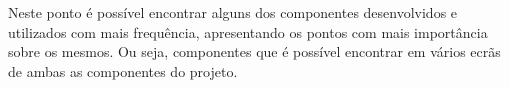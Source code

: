 
Neste ponto é possível encontrar alguns dos componentes desenvolvidos e utilizados com mais frequência, apresentando os pontos com mais importância sobre os mesmos. Ou seja, componentes que é possível encontrar em vários ecrãs de ambas as componentes do projeto.



